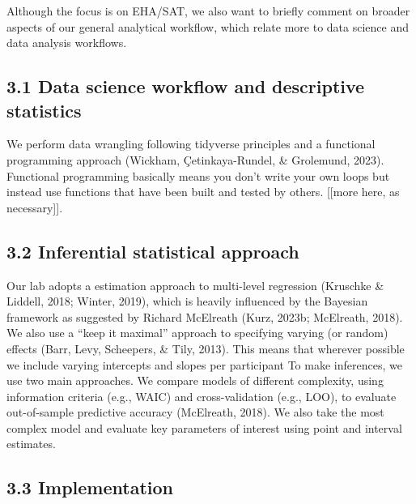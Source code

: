 \documentclass[
  man, donotrepeattitle,floatsintext]{apa6}
\begin{document}
Although the focus is on EHA/SAT, we also want to briefly comment on broader aspects of our general analytical workflow, which relate more to data science and data analysis workflows.

\subsection{3.1 Data science workflow and descriptive statistics}\label{data-science-workflow-and-descriptive-statistics}

We perform data wrangling following tidyverse principles and a functional programming approach (Wickham, Çetinkaya-Rundel, \& Grolemund, 2023).
Functional programming basically means you don't write your own loops but instead use functions that have been built and tested by others.
{[}{[}more here, as necessary{]}{]}.

\subsection{3.2 Inferential statistical approach}\label{inferential-statistical-approach}

Our lab adopts a estimation approach to multi-level regression (Kruschke \& Liddell, 2018; Winter, 2019), which is heavily influenced by the Bayesian framework as suggested by Richard McElreath (Kurz, 2023b; McElreath, 2018). We also use a ``keep it maximal'' approach to specifying varying (or random) effects (Barr, Levy, Scheepers, \& Tily, 2013). This means that wherever possible we include varying intercepts and slopes per participant
To make inferences, we use two main approaches. We compare models of different complexity, using information criteria (e.g., WAIC) and cross-validation (e.g., LOO), to evaluate out-of-sample predictive accuracy (McElreath, 2018). We also take the most complex model and evaluate key parameters of interest using point and interval estimates.

\subsection{3.3 Implementation}\label{implementation}
\end{document}
